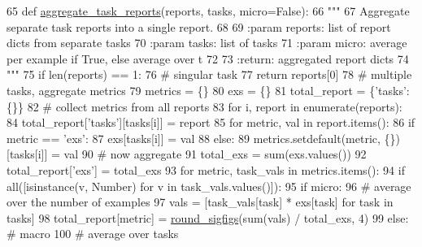 \begin{DoxyCode}
65 \textcolor{keyword}{def }\hyperlink{namespaceparlai_1_1core_1_1metrics_ae323045c05ed03d93c260521ebb8bf71}{aggregate\_task\_reports}(reports, tasks, micro=False):
66     \textcolor{stringliteral}{"""}
67 \textcolor{stringliteral}{    Aggregate separate task reports into a single report.}
68 \textcolor{stringliteral}{}
69 \textcolor{stringliteral}{    :param reports: list of report dicts from separate tasks}
70 \textcolor{stringliteral}{    :param tasks: list of tasks}
71 \textcolor{stringliteral}{    :param micro: average per example if True, else average over t}
72 \textcolor{stringliteral}{}
73 \textcolor{stringliteral}{    :return: aggregated report dicts}
74 \textcolor{stringliteral}{    """}
75     \textcolor{keywordflow}{if} len(reports) == 1:
76         \textcolor{comment}{# singular task}
77         \textcolor{keywordflow}{return} reports[0]
78     \textcolor{comment}{# multiple tasks, aggregate metrics}
79     metrics = \{\}
80     exs = \{\}
81     total\_report = \{\textcolor{stringliteral}{'tasks'}: \{\}\}
82     \textcolor{comment}{# collect metrics from all reports}
83     \textcolor{keywordflow}{for} i, report \textcolor{keywordflow}{in} enumerate(reports):
84         total\_report[\textcolor{stringliteral}{'tasks'}][tasks[i]] = report
85         \textcolor{keywordflow}{for} metric, val \textcolor{keywordflow}{in} report.items():
86             \textcolor{keywordflow}{if} metric == \textcolor{stringliteral}{'exs'}:
87                 exs[tasks[i]] = val
88             \textcolor{keywordflow}{else}:
89                 metrics.setdefault(metric, \{\})[tasks[i]] = val
90     \textcolor{comment}{# now aggregate}
91     total\_exs = sum(exs.values())
92     total\_report[\textcolor{stringliteral}{'exs'}] = total\_exs
93     \textcolor{keywordflow}{for} metric, task\_vals \textcolor{keywordflow}{in} metrics.items():
94         \textcolor{keywordflow}{if} all([isinstance(v, Number) \textcolor{keywordflow}{for} v \textcolor{keywordflow}{in} task\_vals.values()]):
95             \textcolor{keywordflow}{if} micro:
96                 \textcolor{comment}{# average over the number of examples}
97                 vals = [task\_vals[task] * exs[task] \textcolor{keywordflow}{for} task \textcolor{keywordflow}{in} tasks]
98                 total\_report[metric] = \hyperlink{namespaceparlai_1_1agents_1_1legacy__agents_1_1seq2seq_1_1utils__v0_af377ec61bfc0423461e7b409ffc883b9}{round\_sigfigs}(sum(vals) / total\_exs, 4)
99             \textcolor{keywordflow}{else}:  \textcolor{comment}{# macro}
100                 \textcolor{comment}{# average over tasks}

\end{DoxyCode}
